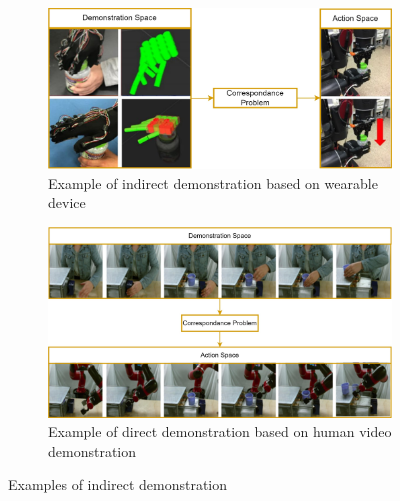 \begin{figure}[tb]
     \centering
     \begin{subfigure}[b]{0.63\textwidth}
         \includegraphics[width=\textwidth]{figures/images/wearable_indirect_teaching.jpg}
         \caption{Example of indirect demonstration based on wearable device~\cite{liu2019_mirroring_without_overimitation}}
         \label{fig:wearable_indirect}
     \end{subfigure}
     \vfill
     \vfill
     \begin{subfigure}[b]{0.63\textwidth}
         \includegraphics[width=\textwidth]{figures/images/visual_indirect_teaching.jpg}
         \caption{Example of direct demonstration based on human video demonstration~\cite{smith2019avid}}
         \label{fig:visual_indirect}
     \end{subfigure}

    \caption{Examples of indirect demonstration}
    \label{fig:indirect_demonstrations}
\end{figure}


